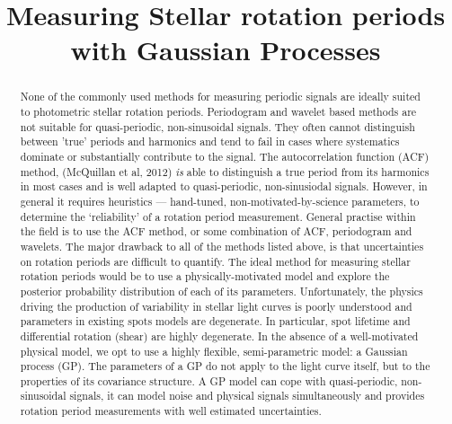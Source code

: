\documentclass[10pt,preprint]{aastex}
\begin{document}
\title{Measuring Stellar rotation periods with Gaussian Processes}

\begin{abstract}

None of the commonly used methods for measuring periodic signals are ideally suited to photometric stellar rotation periods.
Periodogram and wavelet based methods are not suitable for quasi-periodic, non-sinusoidal signals.
They often cannot distinguish between 'true' periods and harmonics and tend to fail in cases where systematics dominate or substantially contribute to the signal.
The autocorrelation function (ACF) method, (McQuillan et al, 2012) \emph{is} able to distinguish a true period from its harmonics in most cases and is well adapted to quasi-periodic, non-sinusiodal signals.
However, in general it requires heuristics --- hand-tuned, non-motivated-by-science parameters, to determine the `reliability' of a rotation period measurement.
General practise within the field is to use the ACF method, or some combination of ACF, periodogram and wavelets. %
The major drawback to all of the methods listed above, is that uncertainties on rotation periods are difficult to quantify.
The ideal method for measuring stellar rotation periods would be to use a physically-motivated model and explore the posterior probability distribution of each of its parameters.
Unfortunately, the physics driving the production of variability in stellar light curves is poorly understood and parameters in existing spots models are degenerate.
In particular, spot lifetime and differential rotation (shear) are highly degenerate.
In the absence of a well-motivated physical model, we opt to use a highly flexible, semi-parametric model: a Gaussian process (GP).
The parameters of a GP do not apply to the light curve itself, but to the properties of its covariance structure.
A GP model can cope with quasi-periodic, non-sinusoidal signals, it can model noise and physical signals simultaneously and provides rotation period measurements with well estimated uncertainties.


\end{abstract}
\end{document}

